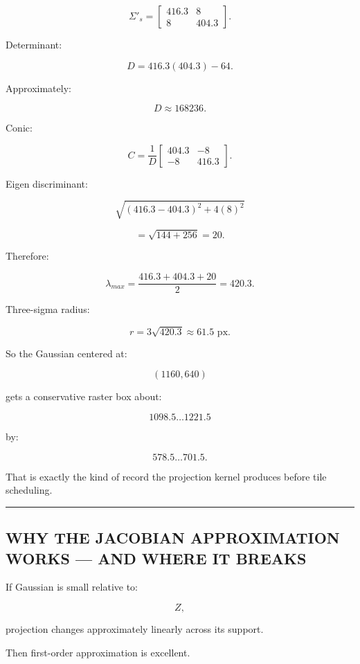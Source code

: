 \[
\Sigma'_s=
\begin{bmatrix}
416.3&8\\
8&404.3
\end{bmatrix}.
\]

Determinant:

\[
D=
416.3(404.3)-64.
\]

Approximately:

\[
D\approx168236.
\]

Conic:

\[
C=
\frac1D
\begin{bmatrix}
404.3&-8\\
-8&416.3
\end{bmatrix}.
\]

Eigen discriminant:

\[
\sqrt{
(416.3-404.3)^2
+
4(8)^2
}
\]

\[
=
\sqrt{
144+256
}
=
20.
\]

Therefore:

\[
\lambda_{max}
=
\frac{
416.3+404.3+20
}{2}
=
420.3.
\]

Three-sigma radius:

\[
r=
3\sqrt{420.3}
\approx61.5\text{ px}.
\]

So the Gaussian centered at:

\[
(1160,640)
\]

gets a conservative raster box about:

\[
1098.5\ldots1221.5
\]

by:

\[
578.5\ldots701.5.
\]

That is exactly the kind of record the projection kernel produces before tile scheduling.

\begin{center}\rule{0.5\linewidth}{0.5pt}\end{center}

\subsection{WHY THE JACOBIAN APPROXIMATION WORKS --- AND WHERE IT BREAKS}\label{04-visual-computing-ii-ch038-why-the-jacobian-approximation-works-and-where-it-breaks}

If Gaussian is small relative to:

\[
Z,
\]

projection changes approximately linearly across its support.

Then first-order approximation is excellent.

